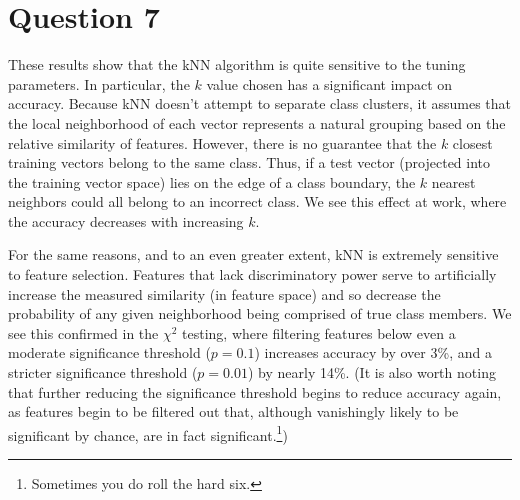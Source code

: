 \documentclass[oneside,justified,marginals=raggedouter]{tufte-handout}
\begin{document}
\section{Question 7}

These results show that the kNN algorithm is quite sensitive to the
tuning parameters. In particular, the $k$ value chosen has a significant
impact on accuracy. Because kNN doesn't attempt to separate class clusters,
it assumes that the local neighborhood of each vector
represents a natural grouping based on the relative
similarity of features. However, there is no guarantee that the $k$ closest
training vectors belong to the same class. Thus, if a test vector (projected
into the training vector space) lies on the edge of a class boundary, the
$k$ nearest neighbors could all belong to an incorrect class. We see this
effect at work, where the accuracy decreases with increasing $k$.

For the same reasons, and to an even greater extent, kNN is extremely
sensitive to feature selection. Features that lack discriminatory power
serve to artificially increase the measured similarity (in feature space) and
so decrease the probability of any given neighborhood being comprised of
true class members. We see this confirmed in the $\chi^2$ testing, where
filtering features below even a moderate significance threshold ($p=0.1$)
increases accuracy by over 3\%, and a stricter significance threshold ($p=0.01$)
by nearly 14\%. (It is also worth noting that further reducing the significance
threshold begins to reduce accuracy again, as features begin to be filtered
out that, although vanishingly likely to be significant by chance, are in fact
significant.\footnote{Sometimes you do roll the hard six.})
\end{document}
